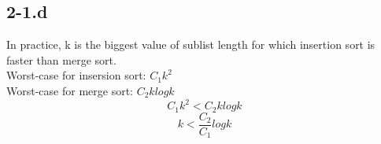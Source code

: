 \subsection*{2-1.d}
In practice, k is the biggest value of sublist length for which insertion sort is faster than merge sort.\\
Worst-case for insersion sort: $C_1k^2$\\
Worst-case for merge sort: $C_2klogk$
\begin{equation*}
	C_1k^2 < C_2klogk 
\end{equation*}
\begin{equation*}
	k < \frac{C_2}{C_1}logk
\end{equation*}
